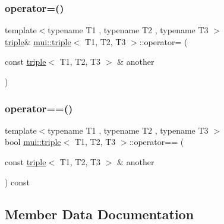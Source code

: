 \mbox{\label{structmui_1_1triple_afdcc6a5f9597efffe7f745cd992295e8}} 
\subsubsection{\texorpdfstring{operator=()}{operator=()}}
{\footnotesize\ttfamily template$<$typename T1 , typename T2 , typename T3 $>$ \\
\hyperlink{structmui_1_1triple}{triple}\& \hyperlink{structmui_1_1triple}{mui\+::triple}$<$ T1, T2, T3 $>$\+::operator= (\begin{DoxyParamCaption}\item[{const \hyperlink{structmui_1_1triple}{triple}$<$ T1, T2, T3 $>$ \&}]{another }\end{DoxyParamCaption})\hspace{0.3cm}{\ttfamily [inline]}}

\mbox{\label{structmui_1_1triple_a126405199031f10cc137387441c71449}} 
\subsubsection{\texorpdfstring{operator==()}{operator==()}}
{\footnotesize\ttfamily template$<$typename T1 , typename T2 , typename T3 $>$ \\
bool \hyperlink{structmui_1_1triple}{mui\+::triple}$<$ T1, T2, T3 $>$\+::operator== (\begin{DoxyParamCaption}\item[{const \hyperlink{structmui_1_1triple}{triple}$<$ T1, T2, T3 $>$ \&}]{another }\end{DoxyParamCaption}) const\hspace{0.3cm}{\ttfamily [inline]}}



\subsection{Member Data Documentation}
\mbox{\label{structmui_1_1triple_ad0100211cd92f6a517934ddb893f64d8}} 
